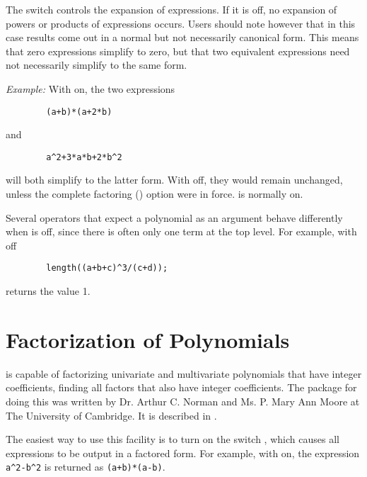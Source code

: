 The switch  controls the expansion of expressions.  If
it is off, no expansion of powers or products of expressions occurs.
Users should note however that in this case results come out in a normal
but not necessarily canonical form.  This means that zero expressions
simplify to zero, but that two equivalent expressions need not necessarily
simplify to the same form.

\textit{Example:} With  on, the two expressions
\begin{verbatim}
        (a+b)*(a+2*b)
\end{verbatim}
and
\begin{verbatim}
        a^2+3*a*b+2*b^2
\end{verbatim}
will both simplify to the latter form.  With 
off, they would remain unchanged, unless the complete factoring 
() option were in force.  is normally on.

Several operators that expect a polynomial as an argument behave
differently when  is off, since there is often only one term at
the top level.  For example, with  off
\begin{verbatim}
        length((a+b+c)^3/(c+d));
\end{verbatim}
returns the value 1.

\section{Factorization of Polynomials}
\hypertarget{switch:FACTOR}{}
\hypertarget{switch:IFACTOR}{}

{\REDUCE} is capable of factorizing univariate and multivariate polynomials
that have integer coefficients, finding all factors that also have integer
coefficients. The package for doing this was written by Dr. Arthur C.
Norman and Ms. P. Mary Ann Moore at The University of Cambridge. It is
described in \cite{NormanMoore:1981A}.

The easiest way to use this facility is to turn on the switch
, which causes all expressions to be output in
a factored form.  For example, with  on, the expression
\texttt{a\textasciicircum2-b\textasciicircum2} is returned as 
\texttt{(a+b)*(a-b)}.

